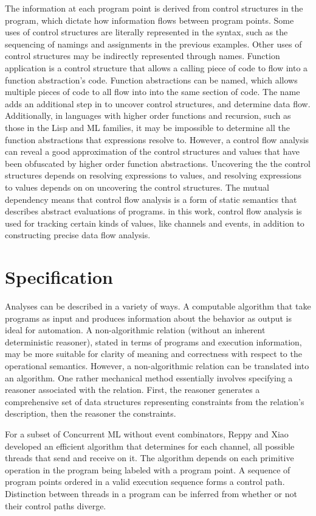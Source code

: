 \documentclass[10pt]{article}
\begin{document}
The information at each program point is derived from control structures in the program, which
dictate how information flows between program points. Some uses of control structures are
literally represented in the syntax, such as the sequencing of namings and assignments in the
previous examples. Other uses of control structures may be indirectly represented through
names. Function application is a control structure that allows a calling piece of code to
flow into a function abstraction's code.  Function abstractions can be named, which allows
multiple pieces of code to all flow into into the same section of code. The name adds an
additional step in to uncover control structures, and determine data flow.
Additionally, in languages with higher order functions and recursion, such as those in the Lisp
and ML families, it may be impossible to determine all the function abstractions that
expressions resolve to. However, a control flow analysis can reveal a good
approximation of the control structures and values that have been obfuscated by higher order
function abstractions.  Uncovering the the control structures depends on resolving expressions
to values, and resolving expressions to values depends on on uncovering the control
structures. The mutual dependency means that control flow analysis is a form of
static semantics that describes abstract evaluations of programs. in this work, control flow
analysis is used for tracking certain kinds of values, like channels and events, in addition to
constructing precise data flow analysis. 

\section{Specification}
Analyses can be described in a variety of ways. A computable algorithm that take programs
as input and produces information about the behavior as output is ideal for automation. A
non-algorithmic relation (without an inherent deterministic reasoner),
stated in terms of programs and execution information, may be
more suitable for clarity of meaning and correctness with respect to the operational
semantics. However, a non-algorithmic relation can be translated into an algorithm.
One rather mechanical method essentially involves
specifying a reasoner associated with the relation. 
First, the reasoner generates a comprehensive set of data structures representing
constraints from the relation's description, then the reasoner the constraints.

For a subset of Concurrent ML without event combinators, Reppy and Xiao developed an
efficient algorithm that determines for each channel, all possible threads that send
and receive on it. The algorithm depends on each primitive operation in the program being
labeled with a program point. A sequence of program points ordered in a valid execution
sequence forms a control path. Distinction between threads in a program can be inferred from
whether or not their control paths diverge.  
\end{document}
